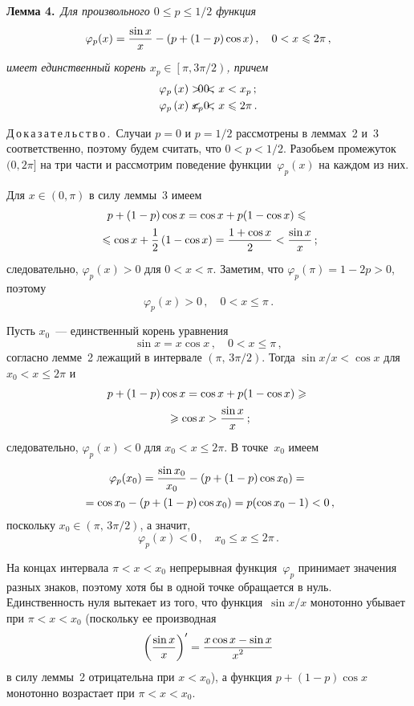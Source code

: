 \begin{multicols}{2}
\medskip

\noindent
\textbf{Лемма 4.}\ \textit{Для произвольного $0\le p\le 1/2$ функция}
$$
\varphi_p(x)=\displaystyle\frac{\displaystyle \sin x\mathstrut}{\displaystyle x\mathstrut}-(p+(1-p)\cos x)\,,\quad 0<x\leqslant2\pi\,,
$$
\textit{имеет единственный корень $x_p\in\left[\pi,3\pi/2\right)$, причем}
\begin{align*}
 \varphi_p\,(x)&>0\,, &\hspace*{-30pt}  0&<x<x_p\,; \\
  \varphi_p\,(x)&<0\,, &\hspace*{-30pt} x_p&<x\le2\pi\,.
\end{align*}

\medskip

\noindent
Д\,о\,к\,а\,з\,а\,т\,е\,л\,ь\,с\,т\,в\,о\,.\
Случаи $p=0$ и $p=1/2$ рассмотрены в леммах~2
и~3 соответственно, поэтому будем считать, что $0<p<1/2.$
Разобьем промежуток $(0,2\pi]$ на три части и рассмотрим поведение
функции~$\varphi_p(x)$ на каждом из них.

Для $x\in(0,\pi)$ в силу леммы~3 имеем
\begin{multline*}
p+(1-p)\cos x=\cos x+p(1-\cos x)\leqslant{}\\
{}\leqslant
\cos x+\displaystyle\frac{\displaystyle 1\mathstrut}{\displaystyle 2\mathstrut}\left( 1-\cos x\right )=
\displaystyle\frac{\displaystyle 1+\cos x\mathstrut}{\displaystyle 2\mathstrut}<\displaystyle\frac{\displaystyle \sin x\mathstrut}{\displaystyle x\mathstrut}\,;
\end{multline*}
следовательно, $\varphi_p(x)>0$ для $0<x<\pi.$ Заметим, что
$\varphi_p(\pi)=1-2p>0$, поэтому
$$
\varphi_p(x)>0\,,\quad 0<x\le\pi\,.
$$

Пусть $x_0$~--- единственный корень уравнения
$$
\sin x=x\cos x\,,\quad 0<x\le\pi\,,
$$
согласно лемме~2 лежащий в интервале ${(\pi,\, 3\pi/2)}$.
Тогда $\sin x/x<\cos x$ для ${x_0<x\le 2\pi}$ и
\begin{multline*}
p+(1-p)\cos x=\cos x+p(1-\cos x)\geqslant{}\\
{}\geqslant \cos x>\displaystyle\frac{\displaystyle \sin x\mathstrut}{\displaystyle x\mathstrut}\,;
\end{multline*}
следовательно, $\varphi_p(x)<0$ для $x_0<x\le2\pi.$ В точке~$x_0$
имеем
\begin{multline*}
\varphi_p(x_0)=\displaystyle\frac{\displaystyle \sin x_0\mathstrut}{\displaystyle x_0\mathstrut}-(p+(1-p)\cos x_0)={}\\
{}=  \cos x_0-(p+(1-p)\cos x_0)=p(\cos x_0-1)<0\,,
\end{multline*}
поскольку $x_0\in(\pi,\,3\pi/2)$, а значит,
$$
\varphi_p(x)<0\,,\quad x_0\le x\le 2\pi\,.
$$

На концах интервала $\pi< x< x_0$ непрерывная функция~$\varphi_p$
принимает значения разных знаков, поэтому хотя бы в одной точке
обращается в нуль. Единственность нуля вытекает из того, что функция~$\sin x/x$
монотонно убывает при $\pi< x< x_0$ (поскольку ее производная
$$
\left(\displaystyle\frac{\displaystyle \sin x\mathstrut}{\displaystyle x\mathstrut}\right)^\prime=\displaystyle\frac{\displaystyle x\cos x-\sin x\mathstrut}{\displaystyle x^2\mathstrut}
$$
в силу леммы~2 отрицательна при $x<x_0$), а функция
$p+(1-p)\cos x$ монотонно возрастает при $\pi< x< x_0$.


\end{multicols}
